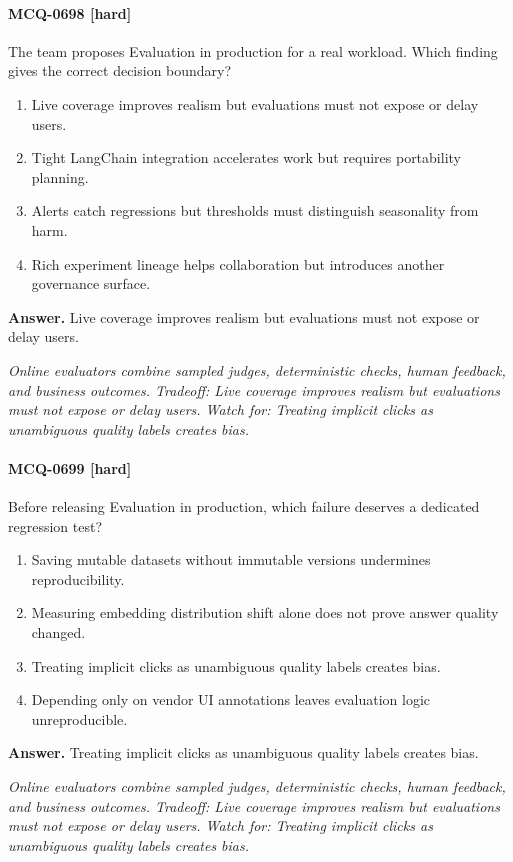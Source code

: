 \paragraph{MCQ-0698 [hard]} The team proposes Evaluation in production for a real workload. Which finding gives the correct decision boundary?
\begin{enumerate}[label=\Alph*.]
\item Live coverage improves realism but evaluations must not expose or delay users.
\item Tight LangChain integration accelerates work but requires portability planning.
\item Alerts catch regressions but thresholds must distinguish seasonality from harm.
\item Rich experiment lineage helps collaboration but introduces another governance surface.
\end{enumerate}
\noindent\textbf{Answer.} Live coverage improves realism but evaluations must not expose or delay users.
\par\textit{Online evaluators combine sampled judges, deterministic checks, human feedback, and business outcomes. Tradeoff: Live coverage improves realism but evaluations must not expose or delay users. Watch for: Treating implicit clicks as unambiguous quality labels creates bias.}
\paragraph{MCQ-0699 [hard]} Before releasing Evaluation in production, which failure deserves a dedicated regression test?
\begin{enumerate}[label=\Alph*.]
\item Saving mutable datasets without immutable versions undermines reproducibility.
\item Measuring embedding distribution shift alone does not prove answer quality changed.
\item Treating implicit clicks as unambiguous quality labels creates bias.
\item Depending only on vendor UI annotations leaves evaluation logic unreproducible.
\end{enumerate}
\noindent\textbf{Answer.} Treating implicit clicks as unambiguous quality labels creates bias.
\par\textit{Online evaluators combine sampled judges, deterministic checks, human feedback, and business outcomes. Tradeoff: Live coverage improves realism but evaluations must not expose or delay users. Watch for: Treating implicit clicks as unambiguous quality labels creates bias.}
